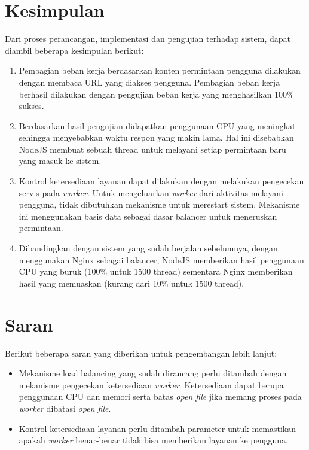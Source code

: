 \documentclass{ta-its}
\begin{document}
			\section{Kesimpulan}
				Dari proses perancangan, implementasi dan pengujian terhadap sistem, dapat diambil beberapa kesimpulan berikut:
				\begin{enumerate}
					\item Pembagian beban kerja berdasarkan konten permintaan pengguna dilakukan dengan membaca URL yang diakses pengguna. Pembagian beban kerja berhasil dilakukan dengan pengujian beban kerja yang menghasilkan 100\% sukses. 
					\item Berdasarkan hasil pengujian didapatkan penggunaan CPU yang meningkat sehingga menyebabkan waktu respon yang makin lama. Hal ini disebabkan NodeJS membuat sebuah thread untuk melayani setiap permintaan baru yang masuk ke sistem.
					\item Kontrol ketersediaan layanan dapat dilakukan dengan melakukan pengecekan servis pada \textit{worker}. Untuk mengeluarkan \textit{worker} dari aktivitas melayani pengguna, tidak dibutuhkan mekanisme untuk merestart sistem. Mekanisme ini menggunakan basis data sebagai dasar balancer untuk meneruskan permintaan.
					\item Dibandingkan dengan sistem yang sudah berjalan sebelumnya, dengan menggunakan Nginx sebagai balancer, NodeJS memberikan hasil penggunaan CPU yang buruk (100\% untuk 1500 thread) sementara Nginx memberikan hasil yang memuaskan (kurang dari 10\% untuk 1500 thread).
				\end{enumerate}
			
			\section{Saran}
				Berikut beberapa saran yang diberikan untuk pengembangan lebih lanjut:
				\begin{itemize}
					\item Mekanisme load balancing yang sudah dirancang perlu ditambah dengan mekanisme pengecekan ketersediaan \textit{worker}. Ketersediaan dapat berupa penggunaan CPU dan memori serta batas \textit{open file} jika memang proses pada \textit{worker} dibatasi \textit{open file}.
					\item Kontrol ketersediaan layanan perlu ditambah parameter untuk memastikan apakah \textit{worker} benar-benar tidak bisa memberikan layanan ke pengguna.
				\end{itemize}
				
\end{document}

